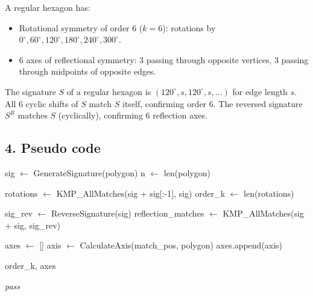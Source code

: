 \begin{example}
\label{ex:ps_hexagon}
A regular hexagon has:
\begin{itemize}
    \item Rotational symmetry of order 6 ($k=6$): rotations by $0^\circ, 60^\circ, 120^\circ, 180^\circ, 240^\circ, 300^\circ$.
    \item 6 axes of reflectional symmetry: 3 passing through opposite vertices, 3 passing through midpoints of opposite edges.
\end{itemize}
The signature $S$ of a regular hexagon is $(120^\circ, s, 120^\circ, s, \dots)$ for edge length $s$. All 6 cyclic shifts of $S$ match $S$ itself, confirming order 6. The reversed signature $S^R$ matches $S$ (cyclically), confirming 6 reflection axes.
\end{example}

\subsection{4. Pseudo code}
\begin{algorithm}
\begin{algorithmic}[1]
\label{alg:detect_symmetries}
    \State sig $\gets$ GenerateSignature(polygon)
    \State n $\gets$ len(polygon)
    
    \State rotations $\gets$ KMP\_AllMatches(sig + sig[:-1], sig)
    \State order\_k $\gets$ len(rotations)
    
    \State sig\_rev $\gets$ ReverseSignature(sig)
    \State reflection\_matches $\gets$ KMP\_AllMatches(sig + sig, sig\_rev)
    
    \State axes $\gets$ []
        \State axis $\gets$ CalculateAxis(match\_pos, polygon)
        \State axes.append(axis)
    \EndFor
        
    \State \Return order\_k, axes
\EndFunction

    \State \textit{pass}
\EndFunction
\end{algorithmic}
\end{algorithm}

